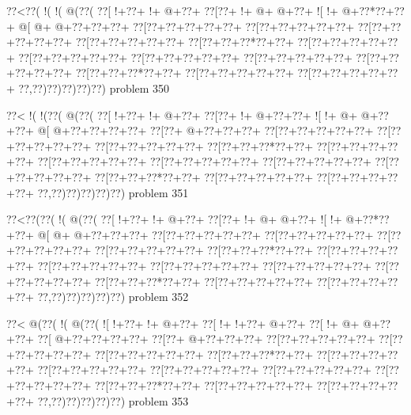 \vbox{\vbox{\goo
\0??<\0??(\- !(\- !(\- @(\0??(
\0??[\- !+\0??+\- !+\- @+\0??+
\0??[\0??+\- !+\- @+\- @+\0??+
\- ![\- !+\- @+\0??*\0??+\0??+
\- @[\- @+\- @+\0??+\0??+\0??+
\0??[\0??+\0??+\0??+\0??+\0??+
\0??[\0??+\0??+\0??+\0??+\0??+
\0??[\0??+\0??+\0??+\0??+\0??+
\0??[\0??+\0??+\0??+\0??+\0??+
\0??[\0??+\0??+\0??*\0??+\0??+
\0??[\0??+\0??+\0??+\0??+\0??+
\0??[\0??+\0??+\0??+\0??+\0??+
\0??[\0??+\0??+\0??+\0??+\0??+
\0??[\0??+\0??+\0??+\0??+\0??+
\0??[\0??+\0??+\0??+\0??+\0??+
\0??[\0??+\0??+\0??*\0??+\0??+
\0??[\0??+\0??+\0??+\0??+\0??+
\0??[\0??+\0??+\0??+\0??+\0??+
\0??,\0??)\0??)\0??)\0??)\0??)
}
\hfil problem 350\hfil\break
}

\vbox{\vbox{\goo
\0??<\- !(\- !(\0??(\- @(\0??(
\0??[\- !+\0??+\- !+\- @+\0??+
\0??[\0??+\- !+\- @+\0??+\0??+
\- ![\- !+\- @+\- @+\0??+\0??+
\- @[\- @+\0??+\0??+\0??+\0??+
\0??[\0??+\- @+\0??+\0??+\0??+
\0??[\0??+\0??+\0??+\0??+\0??+
\0??[\0??+\0??+\0??+\0??+\0??+
\0??[\0??+\0??+\0??+\0??+\0??+
\0??[\0??+\0??+\0??*\0??+\0??+
\0??[\0??+\0??+\0??+\0??+\0??+
\0??[\0??+\0??+\0??+\0??+\0??+
\0??[\0??+\0??+\0??+\0??+\0??+
\0??[\0??+\0??+\0??+\0??+\0??+
\0??[\0??+\0??+\0??+\0??+\0??+
\0??[\0??+\0??+\0??*\0??+\0??+
\0??[\0??+\0??+\0??+\0??+\0??+
\0??[\0??+\0??+\0??+\0??+\0??+
\0??,\0??)\0??)\0??)\0??)\0??)
}
\hfil problem 351\hfil\break
}

\vbox{\vbox{\goo
\0??<\0??(\0??(\- !(\- @(\0??(
\0??[\- !+\0??+\- !+\- @+\0??+
\0??[\0??+\- !+\- @+\- @+\0??+
\- ![\- !+\- @+\0??*\0??+\0??+
\- @[\- @+\- @+\0??+\0??+\0??+
\0??[\0??+\0??+\0??+\0??+\0??+
\0??[\0??+\0??+\0??+\0??+\0??+
\0??[\0??+\0??+\0??+\0??+\0??+
\0??[\0??+\0??+\0??+\0??+\0??+
\0??[\0??+\0??+\0??*\0??+\0??+
\0??[\0??+\0??+\0??+\0??+\0??+
\0??[\0??+\0??+\0??+\0??+\0??+
\0??[\0??+\0??+\0??+\0??+\0??+
\0??[\0??+\0??+\0??+\0??+\0??+
\0??[\0??+\0??+\0??+\0??+\0??+
\0??[\0??+\0??+\0??*\0??+\0??+
\0??[\0??+\0??+\0??+\0??+\0??+
\0??[\0??+\0??+\0??+\0??+\0??+
\0??,\0??)\0??)\0??)\0??)\0??)
}
\hfil problem 352\hfil\break
}

\vbox{\vbox{\goo
\0??<\- @(\0??(\- !(\- @(\0??(
\- ![\- !+\0??+\- !+\- @+\0??+
\0??[\- !+\- !+\0??+\- @+\0??+
\0??[\- !+\- @+\- @+\0??+\0??+
\0??[\- @+\0??+\0??+\0??+\0??+
\0??[\0??+\- @+\0??+\0??+\0??+
\0??[\0??+\0??+\0??+\0??+\0??+
\0??[\0??+\0??+\0??+\0??+\0??+
\0??[\0??+\0??+\0??+\0??+\0??+
\0??[\0??+\0??+\0??*\0??+\0??+
\0??[\0??+\0??+\0??+\0??+\0??+
\0??[\0??+\0??+\0??+\0??+\0??+
\0??[\0??+\0??+\0??+\0??+\0??+
\0??[\0??+\0??+\0??+\0??+\0??+
\0??[\0??+\0??+\0??+\0??+\0??+
\0??[\0??+\0??+\0??*\0??+\0??+
\0??[\0??+\0??+\0??+\0??+\0??+
\0??[\0??+\0??+\0??+\0??+\0??+
\0??,\0??)\0??)\0??)\0??)\0??)
}
\hfil problem 353\hfil\break
}

